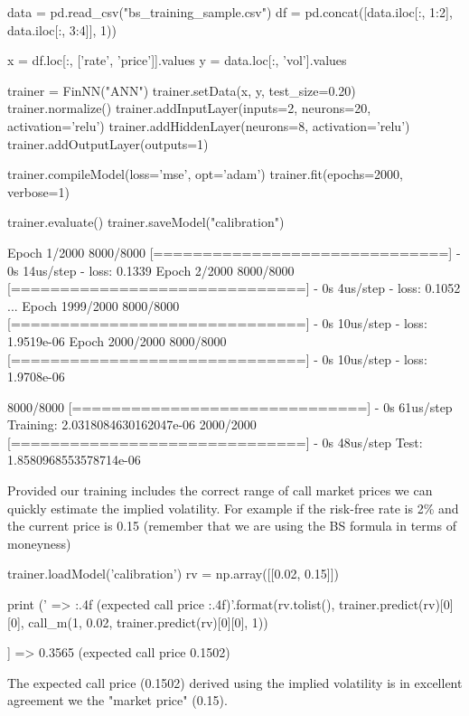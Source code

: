 \begin{ipython}
data = pd.read_csv("bs_training_sample.csv")
df = pd.concat([data.iloc[:, 1:2], data.iloc[:, 3:4]], 1))

x = df.loc[:, ['rate', 'price']].values
y = data.loc[:, 'vol'].values

trainer = FinNN("ANN")
trainer.setData(x, y, test_size=0.20)
trainer.normalize()
trainer.addInputLayer(inputs=2, neurons=20, activation='relu')
trainer.addHiddenLayer(neurons=8, activation='relu')
trainer.addOutputLayer(outputs=1)

trainer.compileModel(loss='mse', opt='adam')
trainer.fit(epochs=2000, verbose=1)

trainer.evaluate()
trainer.saveModel("calibration")
\end{ipython}
\begin{ioutput}
Epoch 1/2000
8000/8000 [==============================] - 0s 14us/step - loss: 0.1339
Epoch 2/2000
8000/8000 [==============================] - 0s 4us/step - loss: 0.1052
...
Epoch 1999/2000
8000/8000 [==============================] - 0s 10us/step - loss: 1.9519e-06
Epoch 2000/2000
8000/8000 [==============================] - 0s 10us/step - loss: 1.9708e-06

8000/8000 [==============================] - 0s 61us/step
Training: 2.0318084630162047e-06
2000/2000 [==============================] - 0s 48us/step
Test: 1.8580968553578714e-06
\end{ioutput}

Provided our training includes the correct range of call market prices we can quickly estimate the implied volatility. For example if the risk-free rate is 2\% and the current price is 0.15 (remember that we are using the BS formula in terms of moneyness)

\begin{ipython}
trainer.loadModel('calibration')
rv = np.array([[0.02, 0.15]])

print ('{} => {:.4f} (expected call price {:.4f})'.format(rv.tolist(),
                                                   trainer.predict(rv)[0][0],
                                                   call_m(1, 0.02, 
                                                   trainer.predict(rv)[0][0], 1))
\end{ipython}
\begin{ioutput}
[[0.02, 0.15]] => 0.3565 (expected call price 0.1502)
\end{ioutput}
\noindent
The expected call price (0.1502) derived using the implied volatility is in excellent agreement we the "market price" (0.15).

